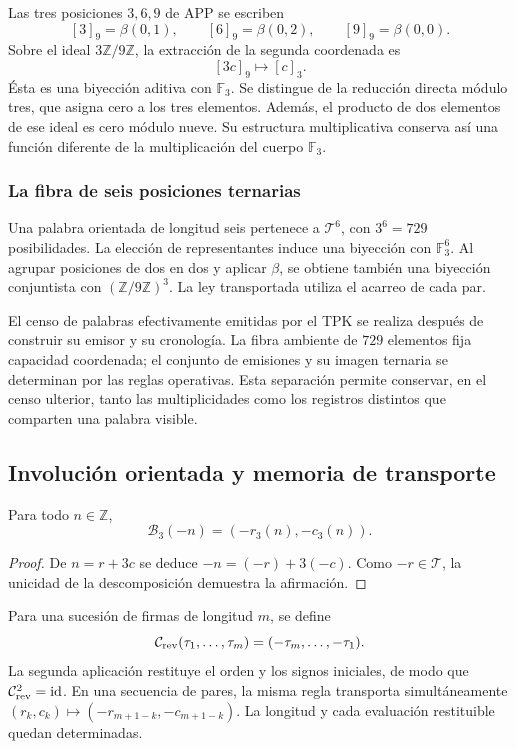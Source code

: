 Las tres posiciones \(3,6,9\) de APP se escriben
\[
 [3]_9=\beta(0,1),\qquad
 [6]_9=\beta(0,2),\qquad
 [9]_9=\beta(0,0).
\]
Sobre el ideal \(3\mathbb Z/9\mathbb Z\), la extracción de la segunda
coordenada es
\[
 [3c]_9\longmapsto[c]_3.
\]
Ésta es una biyección aditiva con \(\mathbb F_3\). Se distingue de la
reducción directa módulo tres, que asigna cero a los tres elementos.
Además, el producto de dos elementos de ese ideal es cero módulo nueve.
Su estructura multiplicativa conserva así una función diferente de la
multiplicación del cuerpo \(\mathbb F_3\).

\subsubsection{La fibra de seis posiciones ternarias}

Una palabra orientada de longitud seis pertenece a \(\mathcal T^6\),
con \(3^6=729\) posibilidades. La elección de representantes induce una
biyección con \(\mathbb F_3^6\). Al agrupar posiciones de dos en dos y
aplicar \(\beta\), se obtiene también una biyección conjuntista con
\((\mathbb Z/9\mathbb Z)^3\). La ley transportada utiliza el acarreo
de cada par.

El censo de palabras efectivamente emitidas por el TPK se realiza después
de construir su emisor y su cronología. La fibra ambiente de \(729\)
elementos fija capacidad coordenada; el conjunto de emisiones y su imagen
ternaria se determinan por las reglas operativas. Esta separación permite
conservar, en el censo ulterior, tanto las multiplicidades como los
registros distintos que comparten una palabra visible.

\subsection{Involución orientada y memoria de transporte}
\label{trit:involucion}

\begin{proposicion}
Para todo \(n\in\mathbb Z\),
\[
 \mathcal B_3(-n)=(-r_3(n),-c_3(n)).
\]
\end{proposicion}
\begin{proof}
De \(n=r+3c\) se deduce \(-n=(-r)+3(-c)\). Como \(-r\in\mathcal T\),
la unicidad de la descomposición demuestra la afirmación.
\end{proof}

Para una sucesión de firmas de longitud \(m\), se define
\[
 \mathcal C_{\rm rev}(\tau_1,\ldots,\tau_m)
 =(-\tau_m,\ldots,-\tau_1).
\]
La segunda aplicación restituye el orden y los signos iniciales, de modo
que \(\mathcal C_{\rm rev}^{2}=\operatorname{id}\). En una secuencia
de pares, la misma regla transporta simultáneamente
\((r_k,c_k)\mapsto(-r_{m+1-k},-c_{m+1-k})\). La longitud y cada
evaluación restituible quedan determinadas.

